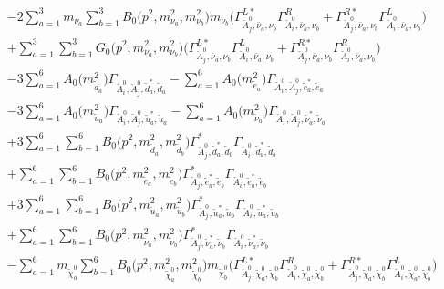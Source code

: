 \begin{itemize}
\begin{align}
 &-2 \sum_{a=1}^{3}m_{\nu_{{a}}} \sum_{b=1}^{3}{B_0\Big(p^{2},m^2_{\nu_{{a}}},m^2_{\nu_{{b}}}\Big)} m_{\nu_{{b}}} \Big({\Gamma^{L*}_{\check{A}^0_{{j}},\bar{\nu}_{{a}},\nu_{{b}}}} {\Gamma^R_{\check{A}^0_{{i}},\bar{\nu}_{{a}},\nu_{{b}}}}  + {\Gamma^{R*}_{\check{A}^0_{{j}},\bar{\nu}_{{a}},\nu_{{b}}}} {\Gamma^L_{\check{A}^0_{{i}},\bar{\nu}_{{a}},\nu_{{b}}}} \Big)  \nonumber \\ 
 &+\sum_{a=1}^{3}\sum_{b=1}^{3}{G_0\Big(p^{2},m^2_{\nu_{{a}}},m^2_{\nu_{{b}}}\Big)} \Big({\Gamma^{L*}_{\check{A}^0_{{j}},\bar{\nu}_{{a}},\nu_{{b}}}} {\Gamma^L_{\check{A}^0_{{i}},\bar{\nu}_{{a}},\nu_{{b}}}}  + {\Gamma^{R*}_{\check{A}^0_{{j}},\bar{\nu}_{{a}},\nu_{{b}}}} {\Gamma^R_{\check{A}^0_{{i}},\bar{\nu}_{{a}},\nu_{{b}}}} \Big)\nonumber \\ 
 &-3 \sum_{a=1}^{6}{A_0\Big(m^2_{\tilde{d}_{{a}}}\Big)} {\Gamma_{\check{A}^0_{{i}},\check{A}^0_{{j}},\tilde{d}^*_{{a}},\tilde{d}_{{a}}}}  - \sum_{a=1}^{6}{A_0\Big(m^2_{\tilde{e}_{{a}}}\Big)} {\Gamma_{\check{A}^0_{{i}},\check{A}^0_{{j}},\tilde{e}^*_{{a}},\tilde{e}_{{a}}}}  \nonumber \\ 
 &-3 \sum_{a=1}^{6}{A_0\Big(m^2_{\tilde{u}_{{a}}}\Big)} {\Gamma_{\check{A}^0_{{i}},\check{A}^0_{{j}},\tilde{u}^*_{{a}},\tilde{u}_{{a}}}}  - \sum_{a=1}^{6}{A_0\Big(m^2_{\tilde{\nu}_{{a}}}\Big)} {\Gamma_{\check{A}^0_{{i}},\check{A}^0_{{j}},\tilde{\nu}^*_{{a}},\tilde{\nu}_{{a}}}}  \nonumber \\ 
 &+3 \sum_{a=1}^{6}\sum_{b=1}^{6}{B_0\Big(p^{2},m^2_{\tilde{d}_{{a}}},m^2_{\tilde{d}_{{b}}}\Big)} {\Gamma^*_{\check{A}^0_{{j}},\tilde{d}^*_{{a}},\tilde{d}_{{b}}}} {\Gamma_{\check{A}^0_{{i}},\tilde{d}^*_{{a}},\tilde{d}_{{b}}}}  \nonumber \\ 
 &+\sum_{a=1}^{6}\sum_{b=1}^{6}{B_0\Big(p^{2},m^2_{\tilde{e}_{{a}}},m^2_{\tilde{e}_{{b}}}\Big)} {\Gamma^*_{\check{A}^0_{{j}},\tilde{e}^*_{{a}},\tilde{e}_{{b}}}} {\Gamma_{\check{A}^0_{{i}},\tilde{e}^*_{{a}},\tilde{e}_{{b}}}} \nonumber \\ 
 &+3 \sum_{a=1}^{6}\sum_{b=1}^{6}{B_0\Big(p^{2},m^2_{\tilde{u}_{{a}}},m^2_{\tilde{u}_{{b}}}\Big)} {\Gamma^*_{\check{A}^0_{{j}},\tilde{u}^*_{{a}},\tilde{u}_{{b}}}} {\Gamma_{\check{A}^0_{{i}},\tilde{u}^*_{{a}},\tilde{u}_{{b}}}}  \nonumber \\ 
 &+\sum_{a=1}^{6}\sum_{b=1}^{6}{B_0\Big(p^{2},m^2_{\tilde{\nu}_{{a}}},m^2_{\tilde{\nu}_{{b}}}\Big)} {\Gamma^*_{\check{A}^0_{{j}},\tilde{\nu}^*_{{a}},\tilde{\nu}_{{b}}}} {\Gamma_{\check{A}^0_{{i}},\tilde{\nu}^*_{{a}},\tilde{\nu}_{{b}}}} \nonumber \\ 
 &- \sum_{a=1}^{6}m_{\tilde{\chi}^0_{{a}}} \sum_{b=1}^{6}{B_0\Big(p^{2},m^2_{\tilde{\chi}^0_{{a}}},m^2_{\tilde{\chi}^0_{{b}}}\Big)} m_{\tilde{\chi}^0_{{b}}} \Big({\Gamma^{L*}_{\check{A}^0_{{j}},\tilde{\chi}^0_{{a}},\tilde{\chi}^0_{{b}}}} {\Gamma^R_{\check{A}^0_{{i}},\tilde{\chi}^0_{{a}},\tilde{\chi}^0_{{b}}}}  + {\Gamma^{R*}_{\check{A}^0_{{j}},\tilde{\chi}^0_{{a}},\tilde{\chi}^0_{{b}}}} {\Gamma^L_{\check{A}^0_{{i}},\tilde{\chi}^0_{{a}},\tilde{\chi}^0_{{b}}}} \Big)  \nonumber \\ 

\end{align}
\end{itemize}
